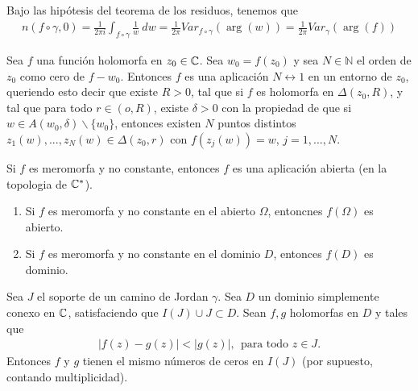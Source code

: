 \begin{obs}
    Bajo las hipótesis del teorema de los residuos, tenemos que
    \begin{align*}
        n(f \circ \gamma,0) = \frac{1}{2\pi i}\int_{f \circ \gamma} \frac{1}{w} \ dw = \frac{1}{2\pi} Var_{f \circ \gamma} (\arg(w)) = \frac{1}{2\pi} Var_{\gamma}(\arg(f))
    \end{align*}
\end{obs}

\begin{teo}
    Sea $f$ una función holomorfa en $z_0 \in \mathbb{C}$. Sea $w_0 = f(z_0)$ y sea $N \in \mathbb{N}$ el orden de $z_0$ como cero de $f-w_0$. Entonces $f$ es una aplicación $N \longleftrightarrow 1$ en un entorno de $z_0$, queriendo esto decir que existe $R > 0$, tal que si $f$ es holomorfa en $\Delta(z_0,R)$, y tal que para todo $r \in (o,R)$, existe $\delta > 0$ con la propiedad de que si $w \in A(w_0,\delta) \backslash \{w_0\}$, entonces existen $N$ puntos distintos $z_1(w),...,z_N(w) \in \Delta(z_0,r)$ con $f(z_j(w)) = w$, $j = 1,...,N$.
\end{teo}

\begin{cor}
    Si $f$ es meromorfa y no constante, entonces $f$ es una aplicación abierta (en la topologia de $\mathbb{C}^*$).
\end{cor}

\begin{obs}
    \begin{enumerate}
        \item Si $f$ es meromorfa y no constante en el abierto $\Omega$, entoncnes $f(\Omega)$ es abierto.
        \item Si $f$ es meromorfa y no constante en el dominio $D$, entonces  $f(D)$ es dominio.
    \end{enumerate}
\end{obs}

\begin{teo}
    Sea $J$ el soporte de un camino de Jordan $\gamma$. Sea $D$ un dominio simplemente conexo en $\mathbb{C}$, satisfaciendo que $I(J) \cup J \subset D$. Sean $f,g$ holomorfas en $D$ y tales que
    \begin{align*}
        |f(z) - g(z)| < |g(z)|, \ \ \text{para todo } z \in J.
    \end{align*}
    Entonces $f$ y $g$ tienen el mismo números de ceros en $I(J)$ (por supuesto, contando multiplicidad).
\end{teo}

